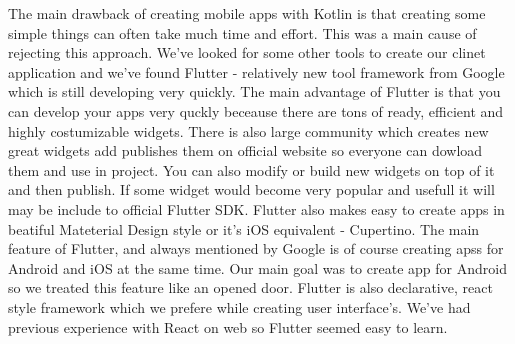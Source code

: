 \documentclass[../Main.tex]{subfiles}
\begin{document}
        The main drawback of creating mobile apps with Kotlin is that creating 
        some simple things can often take much time and effort. 
        This was a main cause of rejecting this approach.
        We've looked for some other tools to create our clinet application and 
        we've found Flutter - relatively new tool framework from Google which 
        is still developing very quickly.
        The main advantage of Flutter is that you can develop your apps very 
        quckly beceause there are tons of ready, efficient and highly costumizable 
        widgets. There is also large community which creates new great widgets 
        add publishes them on official website so everyone can dowload them and use in project.
        You can also modify or build new widgets on top of it and then publish.
        If some widget would become very popular and usefull it will may be 
        include to official Flutter SDK. 
        Flutter also makes easy to create apps in beatiful Mateterial Design 
        style or it's iOS equivalent - Cupertino. 
        The main feature of Flutter, and always mentioned by Google is of course 
        creating apss for Android and iOS at the same time. 
        Our main goal was to create app for Android so we treated this feature like 
        an opened door. 
        Flutter is also declarative, react style framework which we prefere while
        creating user interface's. We've had previous experience with React on web
        so Flutter seemed easy to learn.  
        



\biblio %
\end{document}
